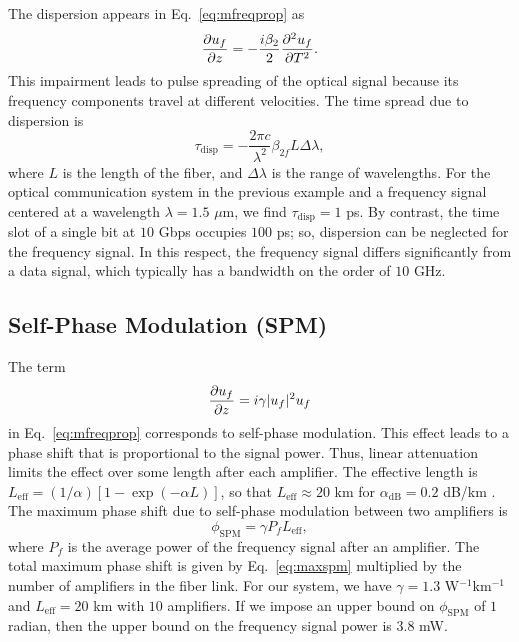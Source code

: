 The dispersion appears in Eq.~\ref{eq:mfreqprop} as
%
\begin{equation}
\frac{\partial u_f}{\partial z} = -\frac{i\beta_{2}}{2}\frac{\partial ^2u_f}{\partial T^2}.
\end{equation}
%
This impairment leads to pulse spreading of the optical signal because its frequency components travel at different velocities. The time spread due to dispersion is \cite{agrawal2012fiber}
%
\begin{equation}
\tau_{\text{disp}} = -\frac{2\pi c}{\lambda^2}\beta_{2f} L\Delta \lambda,
\end{equation}
%
where $L$ is the length of the fiber, and $\Delta\lambda$ is the range of wavelengths. For the optical communication system in the previous example and a frequency signal centered at a wavelength $\lambda = 1.5$ $\mu$m, we find $\tau_{\text{disp}} = 1$ ps. By contrast, the time slot of a single bit at $10$ Gbps occupies $100$ ps; so, dispersion can be neglected for the frequency signal. In this respect, the frequency signal differs significantly from a data signal, which typically has a bandwidth on the order of $10$ GHz.


\subsection{Self-Phase Modulation (SPM)}

The term
\begin{equation}
\frac{\partial u_f}{\partial z} = i\gamma|u_f|^2u_f
\end{equation}
in Eq.~\ref{eq:mfreqprop} corresponds to self-phase modulation. This effect leads to a phase shift that is proportional to the signal power. Thus, linear attenuation limits the effect over some length after each amplifier. The effective length is $L_{\text{eff}} = (1/\alpha)[1-\exp(-\alpha L)]$, so that $L_{\text{eff}} \approx 20$ km for $\alpha_{\text{dB}} = 0.2$ dB/km \cite{Agrawal2013}. The maximum phase shift due to self-phase modulation between two amplifiers is \cite{Agrawal2013}
%
\begin{equation} \label{eq:maxspm}
\phi_{\text{SPM}} = \gamma P_f L_{\text{eff}},
\end{equation}
%
where $P_f$ is the average power of the frequency signal after an amplifier. The total maximum phase shift is given by Eq.~\ref{eq:maxspm} multiplied by the number of amplifiers in the fiber link. For our system, we have $\gamma = 1.3$ W$^{-1}$km$^{-1}$ and $L_{\text{eff}} = 20$ km with $10$ amplifiers. If we impose an upper bound on $\phi_{\text{SPM}}$ of $1$ radian, then the upper bound on the frequency signal power is $3.8$ mW.

